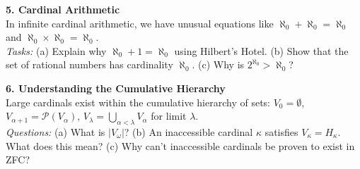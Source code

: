 {\textbf{5. Cardinal Arithmetic} \\[0.5em]
In infinite cardinal arithmetic, we have unusual equations like $\aleph_0 + \aleph_0 = \aleph_0$ and $\aleph_0 \times \aleph_0 = \aleph_0$. \\
\emph{Tasks:} (a) Explain why $\aleph_0 + 1 = \aleph_0$ using Hilbert's Hotel. (b) Show that the set of rational numbers has cardinality $\aleph_0$. (c) Why is $2^{\aleph_0} > \aleph_0$?

\vspace{1em}

\textbf{6. Understanding the Cumulative Hierarchy} \\[0.5em]
Large cardinals exist within the cumulative hierarchy of sets: $V_0 = \emptyset$, $V_{\alpha+1} = \mathcal{P}(V_\alpha)$, $V_\lambda = \bigcup_{\alpha < \lambda} V_\alpha$ for limit $\lambda$. \\
\emph{Questions:} (a) What is $|V_\omega|$? (b) An inaccessible cardinal $\kappa$ satisfies $V_\kappa = H_\kappa$. What does this mean? (c) Why can't inaccessible cardinals be proven to exist in ZFC?
}
